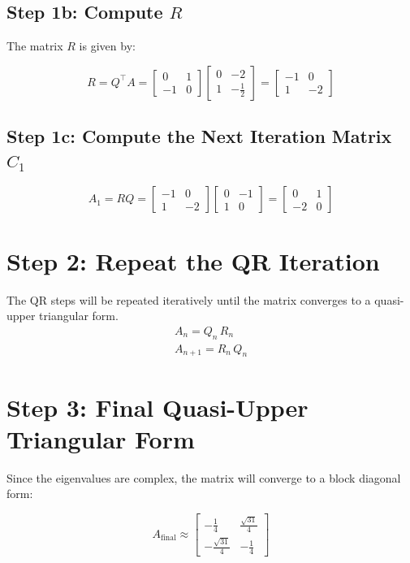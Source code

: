 \documentclass[journal]{IEEEtran}
\begin{document}
\subsection*{Step 1b: Compute $R$}
The matrix $R$ is given by:

\[
R = Q^\top A = \begin{bmatrix}
0 & 1 \\
-1 & 0
\end{bmatrix}
\begin{bmatrix}
0 & -2 \\
1 & -\frac{1}{2}
\end{bmatrix}
=
\begin{bmatrix}
-1 & 0 \\
1 & -2
\end{bmatrix}
\]

\subsection*{Step 1c: Compute the Next Iteration Matrix $C_1$}
\[
A_1 = RQ = \begin{bmatrix}
-1 & 0 \\
1 & -2
\end{bmatrix}
\begin{bmatrix}
0 & -1 \\
1 & 0
\end{bmatrix}
=
\begin{bmatrix}
0 & 1 \\
-2 & 0
\end{bmatrix}
\]

\section*{Step 2: Repeat the QR Iteration}
The QR steps will be repeated iteratively until the matrix converges to a quasi-upper triangular form.
\begin{align}
   A_n = Q_n\,R_n\\
   A_{n+1} = R_n\,Q_n
\end{align}
\section*{Step 3: Final Quasi-Upper Triangular Form}
Since the eigenvalues are complex, the matrix will converge to a block diagonal form:

\[
A_{\text{final}} \approx \begin{bmatrix}
-\frac{1}{4} & \frac{\sqrt{31}}{4} \\
-\frac{\sqrt{31}}{4} & -\frac{1}{4}
\end{bmatrix}
\]
\end{document}
